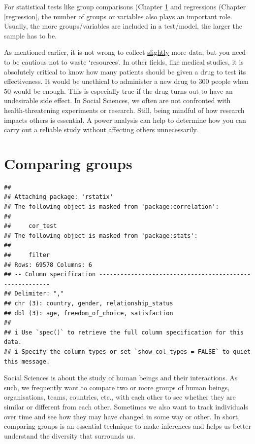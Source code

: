 \documentclass[
]{book}
\begin{document}
For statistical tests like group comparisons (Chapter \ref{comparing-groups} and regressions (Chapter \ref{regression}, the number of groups or variables also plays an important role. Usually, the more groups/variables are included in a test/model, the larger the sample has to be.

As mentioned earlier, it is not wrong to collect \underline{slightly} more data, but you need to be cautious not to waste `resources'. In other fields, like medical studies, it is absolutely critical to know how many patients should be given a drug to test its effectiveness. It would be unethical to administer a new drug to 300 people when 50 would be enough. This is especially true if the drug turns out to have an undesirable side effect. In Social Sciences, we often are not confronted with health-threatening experiments or research. Still, being mindful of how research impacts others is essential. A power analysis can help to determine how you can carry out a reliable study without affecting others unnecessarily.

\hypertarget{comparing-groups}{%
\chapter{Comparing groups}\label{comparing-groups}}

\begin{verbatim}
## 
## Attaching package: 'rstatix'
## The following object is masked from 'package:correlation':
## 
##     cor_test
## The following object is masked from 'package:stats':
## 
##     filter
## Rows: 69578 Columns: 6
## -- Column specification --------------------------------------------------------
## Delimiter: ","
## chr (3): country, gender, relationship_status
## dbl (3): age, freedom_of_choice, satisfaction
## 
## i Use `spec()` to retrieve the full column specification for this data.
## i Specify the column types or set `show_col_types = FALSE` to quiet this message.
\end{verbatim}

Social Sciences is about the study of human beings and their interactions. As such, we frequently want to compare two or more groups of human beings, organisations, teams, countries, etc., with each other to see whether they are similar or different from each other. Sometimes we also want to track individuals over time and see how they may have changed in some way or other. In short, comparing groups is an essential technique to make inferences and helps us better understand the diversity that surrounds us.
\end{document}
